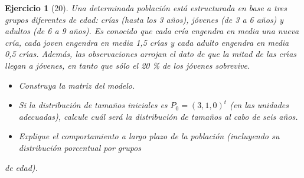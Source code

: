 \documentclass[11pt, a4paper]{article}
\newif\IfInSansMode
\numberwithin{equation}{section}
\theoremstyle{theorem-style}
\theoremstyle{definition-style}
\newtheorem{ejer}{Ejercicio}[section]
\theoremstyle{remark-style}
\theoremstyle{example-style}
\begin{document}
\begin{ejer}[20]
  Una determinada población está estructurada en base a tres grupos diferentes de edad: crías (hasta los 3 años),
jóvenes (de 3 a 6 años) y adultos (de 6 a 9 años). Es conocido que cada cría engendra en media una nueva cría, cada
joven engendra en media 1,5 crı́as y cada adulto engendra en media 0,5 crı́as. Además, las observaciones arrojan el
dato de que la mitad de las crı́as llegan a jóvenes, en tanto que sólo el 20 \% de los jóvenes sobrevive.

\begin{itemize}
\item Construya la matriz del modelo.
\item Si la distribución de tamaños iniciales es $P_0 = (3, 1, 0)^t$ (en las unidades adecuadas), calcule cuál será la distribución de tamaños al cabo de seis años.
\item Explique el comportamiento a largo plazo de la población (incluyendo su distribución porcentual por grupos
\end{itemize}
de edad).

\end{ejer}
\end{document}
